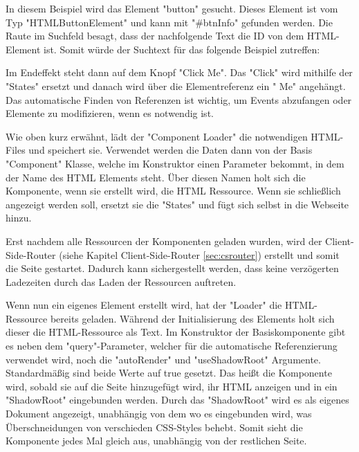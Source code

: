 In diesem Beispiel wird das Element "{\ttfamily button}" gesucht. Dieses Element ist vom Typ "{\ttfamily HTMLButtonElement}" und kann mit "{\ttfamily \#btnInfo}" gefunden werden. Die Raute im Suchfeld besagt, dass der nachfolgende Text die ID von dem HTML-Element ist. Somit würde der Suchtext für das folgende Beispiel zutreffen:


Im Endeffekt steht dann auf dem Knopf "Click Me". Das "Click" wird mithilfe der
"States" ersetzt und danach wird über die Elementreferenz ein " Me" angehängt. Das automatische Finden von Referenzen ist wichtig, um Events abzufangen oder Elemente zu modifizieren, wenn es notwendig ist.

Wie oben kurz erwähnt, lädt der "Component Loader" die notwendigen HTML-Files und speichert sie. Verwendet werden die Daten dann von der Basis "Component" Klasse, welche im Konstruktor einen Parameter bekommt, in dem der Name des HTML Elements steht. Über diesen Namen holt sich die Komponente, wenn sie erstellt wird, die HTML Ressource. Wenn sie schließlich angezeigt werden soll, ersetzt sie die "States" und fügt sich selbst in die Webseite hinzu.


Erst nachdem alle Ressourcen der Komponenten geladen wurden, wird der Client-Side-Router (siehe Kapitel Client-Side-Router \ref{sec:csrouter}) erstellt und somit die Seite gestartet. Dadurch kann sichergestellt werden, dass keine verzögerten Ladezeiten durch das Laden der Ressourcen auftreten.

\begin{minipage}{\textwidth}
    
    Wenn nun ein eigenes Element erstellt wird, hat der "Loader" die HTML-Ressource bereits geladen. Während der Initialisierung des Elements holt sich dieser die HTML-Ressource als Text. Im Konstruktor der Basiskomponente gibt es neben dem "query"-Parameter, welcher für die automatische Referenzierung verwendet wird, noch die "autoRender" und "useShadowRoot" Argumente. Standardmäßig sind beide Werte auf {\ttfamily true} gesetzt. Das heißt die Komponente wird, sobald sie auf die Seite hinzugefügt wird, ihr HTML anzeigen und in ein "ShadowRoot" eingebunden werden. Durch das "ShadowRoot" wird es als eigenes Dokument angezeigt, unabhängig von dem wo es eingebunden wird, was Überschneidungen von verschieden CSS-Styles behebt. Somit sieht die Komponente jedes Mal gleich aus, unabhängig von der restlichen Seite.
\end{minipage}



